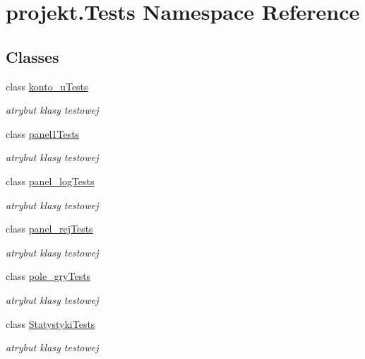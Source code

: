 \hypertarget{namespaceprojekt_1_1_tests}{}\section{projekt.\+Tests Namespace Reference}
\label{namespaceprojekt_1_1_tests}
\subsection*{Classes}
\begin{DoxyCompactItemize}
\item 
class \mbox{\hyperlink{classprojekt_1_1_tests_1_1konto__u_tests}{konto\+\_\+u\+Tests}}
\begin{DoxyCompactList}\small\item\em atrybut klasy testowej \end{DoxyCompactList}\item 
class \mbox{\hyperlink{classprojekt_1_1_tests_1_1panel1_tests}{panel1\+Tests}}
\begin{DoxyCompactList}\small\item\em atrybut klasy testowej \end{DoxyCompactList}\item 
class \mbox{\hyperlink{classprojekt_1_1_tests_1_1panel__log_tests}{panel\+\_\+log\+Tests}}
\begin{DoxyCompactList}\small\item\em atrybut klasy testowej \end{DoxyCompactList}\item 
class \mbox{\hyperlink{classprojekt_1_1_tests_1_1panel__rej_tests}{panel\+\_\+rej\+Tests}}
\begin{DoxyCompactList}\small\item\em atrybut klasy testowej \end{DoxyCompactList}\item 
class \mbox{\hyperlink{classprojekt_1_1_tests_1_1pole__gry_tests}{pole\+\_\+gry\+Tests}}
\begin{DoxyCompactList}\small\item\em atrybut klasy testowej \end{DoxyCompactList}\item 
class \mbox{\hyperlink{classprojekt_1_1_tests_1_1_statystyki_tests}{Statystyki\+Tests}}
\begin{DoxyCompactList}\small\item\em atrybut klasy testowej \end{DoxyCompactList}\end{DoxyCompactItemize}
